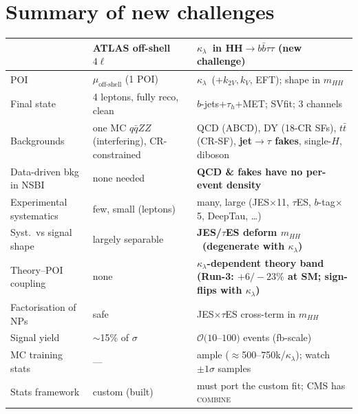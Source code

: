 \documentclass[11pt]{article}
\newcommand{\kl}{\ensuremath{\kappa_\lambda}}
\newcommand{\mhh}{\ensuremath{m_{HH}}}
\newcommand{\bbtt}{\ensuremath{b\bar b\tau\tau}}
\begin{document}
\section{Summary of new challenges}
\begin{table}[h]\centering\small
\begin{tabular}{@{}p{}p{}p{}@{}}
\toprule
 & \textbf{ATLAS off-shell $4\ell$} & \textbf{\kl\ in HH$\to\bbtt$ (new challenge)} \\
\midrule
POI & $\mu_{\text{off-shell}}$ (1 POI) & \kl\ ($+k_{2V},k_V$, EFT); shape in \mhh \\
Final state & 4 leptons, fully reco, clean & $b$-jets+$\tau_h$+MET; SVfit; 3 channels \\
Backgrounds & one MC $q\bar qZZ$ (interfering), CR-constrained & QCD (ABCD), DY (18-CR SFs), $t\bar t$ (CR-SF), \textbf{jet$\to\tau$ fakes}, single-$H$, diboson \\
Data-driven bkg in NSBI & none needed & \textbf{QCD \& fakes have no per-event density} \\
Experimental systematics & few, small (leptons) & many, large (JES$\times$11, $\tau$ES, $b$-tag$\times$5, DeepTau, \ldots) \\
Syst.\ vs signal shape & largely separable & \textbf{JES/$\tau$ES deform \mhh\ (degenerate with \kl)} \\
Theory--POI coupling & none & \textbf{\kl-dependent theory band (Run-3: $+6/-23\%$ at SM; sign-flips with \kl)} \\
Factorisation of NPs & safe & JES$\times\tau$ES cross-term in \mhh \\
Signal yield & $\sim$15\% of $\sigma$ & $\mathcal O(10$--$100)$ events (fb-scale) \\
MC training stats & --- & ample ($\approx$500--750k/\kl); watch $\pm1\sigma$ samples \\
Stats framework & custom (built) & must port the custom fit; CMS has \textsc{combine} \\
\bottomrule
\end{tabular}
\end{table}
\end{document}
